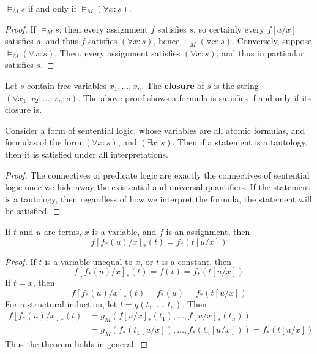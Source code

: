 \begin{lemma}
    $\vDash_M s$ if and only if $\vDash_M (\forall x: s)$.
\end{lemma}
\begin{proof}
    If $\vDash_M s$, then every assignment $f$ satisfies $s$, so certainly every $f[a/x]$ satisfies $s$, and thus $f$ satisfies $(\forall x: s)$, hence $\vDash_M (\forall x: s)$. Conversely, suppose $\vDash_M (\forall x: s)$. Then, every assignment satisfies $(\forall x: s)$, and thus in particular satisfies $s$.
\end{proof}

Let $s$ contain free variables $x_1, \dots, x_n$. The {\bf closure} of $s$ is the string $(\forall x_1, x_2, \dots, x_n: s)$. The above proof shows a formula is satisfies if and only if its closure is.

\begin{theorem}
    Consider a form of sentential logic, whose variables are all atomic formulas, and formulas of the form $(\forall x: s)$, and $(\exists x: s)$. Then if a statement is a tautology, then it is satisfied under all interpretations.
\end{theorem}
\begin{proof}
    The connectives of predicate logic are exactly the connectives of sentential logic once we hide away the existential and universal quantifiers. If the statement is a tautology, then regardless of how we interpret the formula, the statement will be satisfied.
\end{proof}

\begin{lemma}
    If $t$ and $u$ are terms, $x$ is a variable, and $f$ is an assignment, then
    \[ f[f_*(u)/x]_*(t) = f_*(t[u/x]) \]
\end{lemma}
\begin{proof}
    If $t$ is a variable unequal to $x$, or $t$ is a constant, then
    \[ f[f_*(u)/x]_*(t) = f(t) = f_*(t[u/x]) \]
    If $t = x$, then
    \[ f[f_*(u)/x]_*(t) = f_*(u) = f_*(t[u/x]) \]
    For a structural induction, let $t = g(t_1, \dots, t_n)$. Then
    \begin{align*}
        f[f_*(u)/x]_*(t) &= g_M(f[u/x]_*(t_1), \dots, f[u/x]_*(t_n))\\
        &= g_M(f_*(t_1[u/x]), \dots, f_*(t_n[u/x])) = f_*(t[u/x])
    \end{align*}
    Thus the theorem holds in general.
\end{proof}

